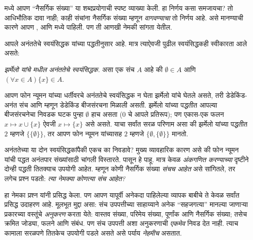 \documentclass[../../../include/open-logic-section]{subfiles}
\begin{document}


 मध्ये आपण ``नैसर्गिक संख्या'' या शब्दप्रयोगाची स्पष्ट व्याख्या केली. हा निर्णय कसा समजायचा? तो आधिभौतिक दावा नाही; काही संचांना नैसर्गिक संख्या म्हणून \emph{वागवण्याचा} तो निर्णय आहे. असे मानण्याची कारणे आपण ,  आणि  मध्ये पाहिली. पण ती आणखी नेमकी सांगता येतील.

आपले अनंततेचे स्वयंसिद्धक \citet{VonNeumann1925} यांच्या पद्धतीनुसार आहे. मात्र त्याऐवजी पुढील स्वयंसिद्धकही स्वीकारता आले असते:

\begin{defish}
\emph{झर्मेलो यांचे \citeyear{Zermelo1908Untersuchungen} मधील अनंततेचे स्वयंसिद्धक.} असा एक संच $A$ आहे की $\emptyset \in A$ आणि $(\forall x \in A)\{x\} \in A$.
\end{defish}

आपण फोन न्यूमन यांच्या धर्तीवरचे अनंततेचे स्वयंसिद्धक न घेता झर्मेलो यांचे घेतले असते, तरी डेडेकिंड-अनंत संच आणि म्हणून डेडेकिंड बीजसंरचना मिळाली असती. झर्मेलो यांच्या पद्धतीत आपल्या बीजसंरचनेचा निवडक घटक पुन्हा $\emptyset$ हाच असता ($0$ चे आपले प्रतिरूप); पण एकास-एक फलन $x \mapsto x \cup \{x\}$ ऐवजी $x \mapsto \{x\}$ असे असते. याचा सर्वांत सरळ परिणाम असा की झर्मेलो यांच्या पद्धतीत $2$ म्हणजे $\{\{\emptyset\}\}$, तर आपण फोन न्यूमन यांच्यासह $2$ म्हणजे $\{\emptyset, \{\emptyset\}\}$ मानतो.

अनंततेच्या या दोन स्वयंसिद्धकांपैकी एकच का निवडावे? मुख्य व्यावहारिक कारण असे की फोन न्यूमन यांची पद्धत अनंतपार संख्यांसाठी चांगली विस्तारते.  पासून हे पाहू. मात्र केवळ \emph{अंकगणित करण्याच्या} दृष्टीने दोन्ही पद्धती तितक्याच उपयोगी आहेत. म्हणून कोणी नैसर्गिक संख्या \emph{संचच आहेत} असे सांगितले, तर लगेच प्रश्न पडतो: \emph{त्या नेमक्या कोणत्या संच आहेत?}

हा नेमका प्रश्न \citet{Benacerraf1965} यांनी प्रसिद्ध केला. पण आपण यापूर्वी अनेकदा पाहिलेल्या व्यापक बाबीचे ते केवळ सर्वांत प्रसिद्ध उदाहरण आहे. मूलभूत मुद्दा असा: संच उपपत्तीच्या साहाय्याने अनेक ``सहजगत्या'' मानल्या जाणाऱ्या प्रकारच्या वस्तूंचे \emph{अनुकरण} करता येते: वास्तव संख्या, परिमेय संख्या, पूर्णांक आणि नैसर्गिक संख्या; तसेच क्रमित जोड्या, फलने आणि संबंध. पण संच उपपत्ती अशा अनुकरणाची \emph{एकमेव} निवड देत नाही. त्याच कामाला सरळपणे तितकेच उपयोगी पडले असते असे पर्याय \emph{नेहमीच} असतात.
\end{document}
